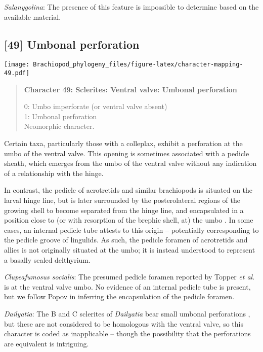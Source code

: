\documentclass[openany]{book}
\theoremstyle{definition}
\theoremstyle{definition}
\theoremstyle{definition}
\theoremstyle{remark}
\begin{document}
\hypertarget{Salanygolina-coding-48}{}
\emph{Salanygolina}: The presence of this feature is impossible to
determine based on the available material.

\subsection*{{[}49{]} Umbonal perforation}\label{umbonal-perforation}

\texttt{[image: Brachiopod\_phylogeny\_files/figure-latex/character-mapping-49.pdf]}

\begin{quote}
\textbf{Character 49: Sclerites: Ventral valve: Umbonal perforation}

0: Umbo imperforate (or ventral valve absent)\\
1: Umbonal perforation\\
Neomorphic character.
\end{quote}

Certain taxa, particularly those with a colleplax, exhibit a perforation
at the umbo of the ventral valve. This opening is sometimes associated
with a pedicle sheath, which emerges from the umbo of the ventral valve
without any indication of a relationship with the hinge.

In contrast, the pedicle of acrotretids and similar brachiopods is
situated on the larval hinge line, but is later surrounded by the
posterolateral regions of the growing shell to become separated from the
hinge line, and encapsulated in a position close to (or with resorption
of the brephic shell, at) the umbo \citep[see][pp.~407--411 and fig. 3
for discussion]{Popov1992TheCambrian}. In some cases, an internal
pedicle tube attests to this origin -- potentially corresponding to the
pedicle groove of lingulids. As such, the pedicle foramen of acrotretids
and allies is not originally situated at the umbo; it is instead
understood to represent a basally sealed delthyrium.

\hypertarget{Clupeafumosus_socialis-coding-49}{}
\emph{Clupeafumosus socialis}: The presumed pedicle foramen reported by
Topper \emph{et al}. \citeyearpar{Topper2013Reappraisalof} is at the
ventral valve umbo. No evidence of an internal pedicle tube is present,
but we follow Popov \citeyearpar{Popov1992TheCambrian} in inferring the
encapsulation of the pedicle foramen.

\hypertarget{Dailyatia-coding-49}{}
\emph{Dailyatia}: The B and C sclerites of \emph{Dailyatia} bear small
umbonal perforations \citep{Skovsted2015Theearly}, but these are not
considered to be homologous with the ventral valve, so this character is
coded as inapplicable -- though the possibility that the perforations
are equivalent is intriguing.
\end{document}
